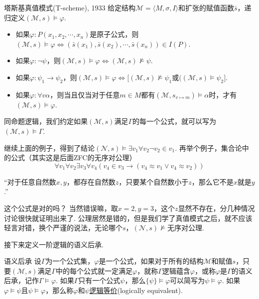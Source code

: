 \begin{definition}{塔斯基真值模式(T-scheme), 1933}
    给定结构\(\mathcal{M} = \langle M,\sigma, I \rangle\)和扩张的赋值函数\(\bar{s}\)，递归定义\((\mathcal{M}, s) \vDash \varphi\).
    \begin{itemize}
        \item 如果\(\varphi: P(x_1,x_2,\cdots,x_n)\)是原子公式，则\((\mathcal{M}, s) \vDash \varphi \Longleftrightarrow (\bar s(x_1), \bar s(x_2), \cdots, \bar s(x_n)) \in I(P)\).
        \item 如果\(\varphi:\neg \psi\)，则\((\mathcal{M}, s) \vDash \varphi \Longleftrightarrow (\mathcal{M}, s) \not \vDash \psi\).
        \item 如果\(\varphi:\psi_1 \to \psi_2\)，则\((\mathcal{M}, s) \vDash \varphi \Longleftrightarrow \big[(\mathcal{M}, s) \not \vDash \psi_1 \mbox{或} ((\mathcal{M}, s) \vDash \psi_2 \big]\).
        \item 如果\(\varphi: \forall v \alpha\)，则当且仅当对于任意\(m \in M\)都有\((\mathcal{M}, s_{v \mapsto m}) \vDash \alpha\)时，才有\((\mathcal{M}, s) \vDash \varphi\).
    \end{itemize}
\end{definition}

\begin{reference}
    同命题逻辑，我们约定如果\((\mathcal{M}, s)\)满足\(\Gamma\)的每一个公式，就可以写为\((\mathcal{M}, s) \vDash \Gamma\).
\end{reference}

继续上面的例子，得到了结论\((\mathcal{N},s) \vDash \exists v_1 \forall v_2 \neg v_2 \in v_1\). 再举个例子，集合论中的公式（其实这是后面\textsf{ZFC}的无序对公理）
\[\forall v_1 \forall v_2 \exists v_3 \forall v_4(v_4 \in v_3 \to (v_4 \approx v_1 \vee v_4 \approx v_2))\]
\begin{center}
    “对于任意自然数\(x,y\)，都存在自然数\(z\)，只要某个自然数小于\(z\)，那么它不是\(x\)就是\(y\).”
\end{center}
这个公式是对的吗？ 当然错误嘛，取\(x=2,y=3\)，这个\(z\)显然不存在，分几种情况讨论很快就证明出来了. 公理居然是错的，但是我们学了真值模式之后，就不应该轻言对错，换个严谨的说法，无论哪个\(s\)，\((\mathcal{N},s) \not \vDash \mbox{无序对公理}\). 

接下来定义一阶逻辑的语义后承.

\begin{definition}{语义后承}
    设\(\Gamma\)为一个公式集，\(\varphi\)是一个公式，如果对于所有的结构\(\mathcal{M}\)和赋值\(s\)，只要\((\mathcal{M}, s)\)满足\(\Gamma\)中的每个公式就一定满足\(\varphi\)，就称\(\Gamma\)逻辑蕴含\(\varphi\)，或称\(\varphi\)是\(\Gamma\)的语义后承，记作\(\Gamma \vDash \varphi\). \newline
    如果\(\Gamma\)只有一个公式\(\psi\)，那么\(\{\psi\} \vDash \varphi\)可以简写为\(\psi \vDash \varphi\). 如果\(\varphi \vDash \psi\)且\(\psi \vDash \varphi\)，那么称\(\varphi\)和\(\psi\)\underline{逻辑等价}(logically equivalent).
\end{definition}

